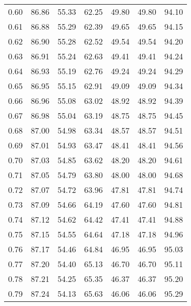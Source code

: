 \begin{tabular}{|c|c|c|c|c|c|c|}
      0.60 &     86.86 &     55.33 &      62.25 &   49.80 &      49.80 &         94.10 \\
      0.61 &     86.88 &     55.29 &      62.39 &   49.65 &      49.65 &         94.15 \\
      0.62 &     86.90 &     55.28 &      62.52 &   49.54 &      49.54 &         94.20 \\
      0.63 &     86.91 &     55.24 &      62.63 &   49.41 &      49.41 &         94.24 \\
      0.64 &     86.93 &     55.19 &      62.76 &   49.24 &      49.24 &         94.29 \\
      0.65 &     86.95 &     55.15 &      62.91 &   49.09 &      49.09 &         94.34 \\
      0.66 &     86.96 &     55.08 &      63.02 &   48.92 &      48.92 &         94.39 \\
      0.67 &     86.98 &     55.04 &      63.19 &   48.75 &      48.75 &         94.45 \\
      0.68 &     87.00 &     54.98 &      63.34 &   48.57 &      48.57 &         94.51 \\
      0.69 &     87.01 &     54.93 &      63.47 &   48.41 &      48.41 &         94.56 \\
      0.70 &     87.03 &     54.85 &      63.62 &   48.20 &      48.20 &         94.61 \\
      0.71 &     87.05 &     54.79 &      63.80 &   48.00 &      48.00 &         94.68 \\
      0.72 &     87.07 &     54.72 &      63.96 &   47.81 &      47.81 &         94.74 \\
      0.73 &     87.09 &     54.66 &      64.19 &   47.60 &      47.60 &         94.81 \\
      0.74 &     87.12 &     54.62 &      64.42 &   47.41 &      47.41 &         94.88 \\
      0.75 &     87.15 &     54.55 &      64.64 &   47.18 &      47.18 &         94.96 \\
      0.76 &     87.17 &     54.46 &      64.84 &   46.95 &      46.95 &         95.03 \\
      0.77 &     87.20 &     54.40 &      65.13 &   46.70 &      46.70 &         95.11 \\
      0.78 &     87.21 &     54.25 &      65.35 &   46.37 &      46.37 &         95.20 \\
      0.79 &     87.24 &     54.13 &      65.63 &   46.06 &      46.06 &         95.29 \\

\end{tabular}
